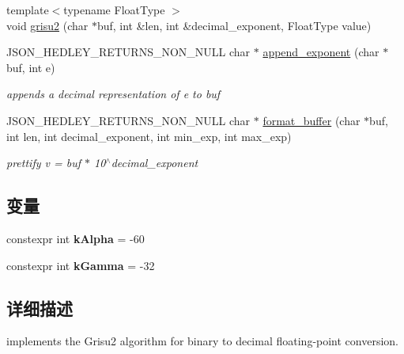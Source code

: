 \begin{DoxyCompactItemize}
\item 
{\footnotesize template$<$typename Float\+Type $>$ }\\void \mbox{\hyperlink{namespacenlohmann_1_1detail_1_1dtoa__impl_aab7a9670a4f4704a5d0347ad7588576b}{grisu2}} (char $\ast$buf, int \&len, int \&decimal\+\_\+exponent, Float\+Type value)
\item 
J\+S\+O\+N\+\_\+\+H\+E\+D\+L\+E\+Y\+\_\+\+R\+E\+T\+U\+R\+N\+S\+\_\+\+N\+O\+N\+\_\+\+N\+U\+LL char $\ast$ \mbox{\hyperlink{namespacenlohmann_1_1detail_1_1dtoa__impl_ad90f19ed10d8133b727df4b9bc5ddf5c}{append\+\_\+exponent}} (char $\ast$buf, int e)
\begin{DoxyCompactList}\small\item\em appends a decimal representation of e to buf \end{DoxyCompactList}\item 
J\+S\+O\+N\+\_\+\+H\+E\+D\+L\+E\+Y\+\_\+\+R\+E\+T\+U\+R\+N\+S\+\_\+\+N\+O\+N\+\_\+\+N\+U\+LL char $\ast$ \mbox{\hyperlink{namespacenlohmann_1_1detail_1_1dtoa__impl_ab441f2761e33839ca48bc2225e14a2a9}{format\+\_\+buffer}} (char $\ast$buf, int len, int decimal\+\_\+exponent, int min\+\_\+exp, int max\+\_\+exp)
\begin{DoxyCompactList}\small\item\em prettify v = buf $\ast$ 10$^\wedge$decimal\+\_\+exponent \end{DoxyCompactList}\end{DoxyCompactItemize}
\subsection*{变量}
\begin{DoxyCompactItemize}
\item 
\mbox{\label{namespacenlohmann_1_1detail_1_1dtoa__impl_ac1ea1316de0b4a219f707c76b1db1966}} 
constexpr int {\bfseries k\+Alpha} = -\/60
\item 
\mbox{\label{namespacenlohmann_1_1detail_1_1dtoa__impl_a4a750fcc38da1ce68b7e25ab3a230e20}} 
constexpr int {\bfseries k\+Gamma} = -\/32
\end{DoxyCompactItemize}


\subsection{详细描述}
implements the Grisu2 algorithm for binary to decimal floating-\/point conversion. 

